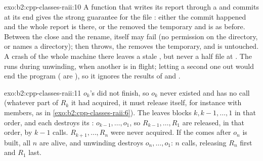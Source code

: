 \begin{solution}{exo:b2:cpp-classes-raii:10}
A function that writes its report through a  and commits at its end gives the strong guarantee for
the file : either the commit happened and the whole report is there, or the  removed the
temporary and  is as before. Between the close and the rename,  itself may fail (no
permission on the directory, or  names a directory); then  throws, the  removes the temporary,
and  is untouched. A crash of the whole machine there leaves a stale , but never a half
file at . The  runs during unwinding, when another  is in flight; letting a second one
out would end the program ( are ), so it ignores the results of  and
.
\end{solution}

\begin{solution}{exo:b2:cpp-classes-raii:11}
$o_k$'s  did not finish, so $o_k$ never existed and has no  call (whatever part of $R_k$ it had
acquired, it must release itself, for instance with members, as in \cref{exo:b2:cpp-classes-raii:6}). The 
leaves blocks $k, k-1, \dots, 1$ in that order, and each destroys its : $o_{k-1}, \dots, o_1$, so
$R_{k-1}, \dots, R_1$ are released, in that order, by $k - 1$  calls. $R_{k+1}, \dots, R_n$ were never
acquired. If the  comes after $o_n$ is built, all $n$  are alive, and unwinding destroys
$o_n, \dots, o_1$: $n$ calls, releasing $R_n$ first and $R_1$ last.
\end{solution}

